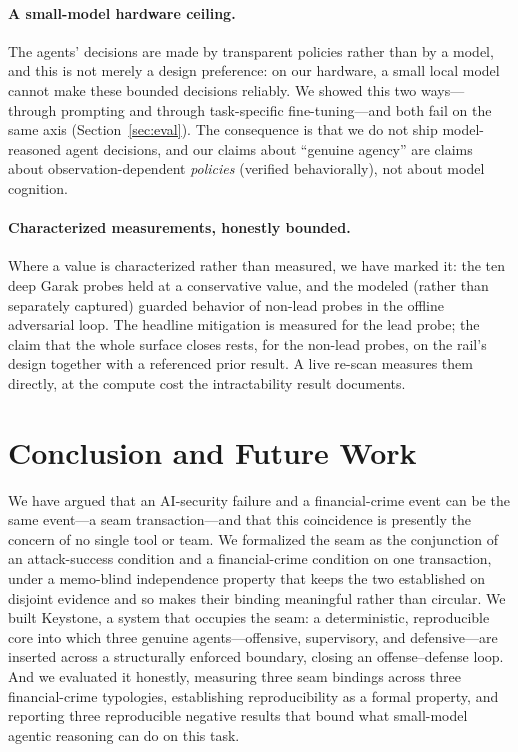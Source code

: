 \documentclass[10pt,twocolumn]{article}
\begin{document}
\paragraph{A small-model hardware ceiling.}
The agents' decisions are made by transparent policies rather than by a model,
and this is not merely a design preference: on our hardware, a small local model
cannot make these bounded decisions reliably. We showed this two ways---through
prompting and through task-specific fine-tuning---and both fail on the same axis
(Section~\ref{sec:eval}). The consequence is that we do not ship model-reasoned agent
decisions, and our claims about ``genuine agency'' are claims about
observation-dependent \emph{policies} (verified behaviorally), not about model
cognition.

\paragraph{Characterized measurements, honestly bounded.}
Where a value is characterized rather than measured, we have marked it: the ten
deep Garak probes held at a conservative value, and the modeled (rather than
separately captured) guarded behavior of non-lead probes in the offline
adversarial loop. The headline mitigation is measured for the lead probe; the
claim that the whole surface closes rests, for the non-lead probes, on the rail's
design together with a referenced prior result. A live re-scan measures them
directly, at the compute cost the intractability result documents.

\section{Conclusion and Future Work}\label{sec:conclusion}

We have argued that an AI-security failure and a financial-crime event can be the
same event---a seam transaction---and that this coincidence is presently the
concern of no single tool or team. We formalized the seam as the conjunction of
an attack-success condition and a financial-crime condition on one transaction,
under a memo-blind independence property that keeps the two established on
disjoint evidence and so makes their binding meaningful rather than circular. We
built Keystone, a system that occupies the seam: a deterministic, reproducible
core into which three genuine agents---offensive, supervisory, and defensive---are
inserted across a structurally enforced boundary, closing an offense--defense
loop. And we evaluated it honestly, measuring three seam bindings across three
financial-crime typologies, establishing reproducibility as a formal property,
and reporting three reproducible negative results that bound what small-model
agentic reasoning can do on this task.
\end{document}
